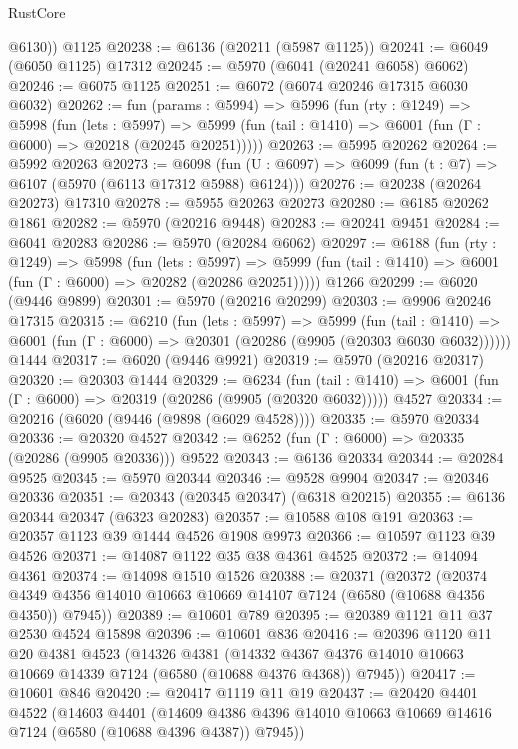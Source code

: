 \begin{lexlean}{RustCore}
\begin{coremodule}
        @6130))
    @1125
@20238 := @6136 (@20211 (@5987 @1125))
@20241 := @6049 (@6050 @1125) @17312
@20245 := @5970 (@6041 (@20241 @6058) @6062)
@20246 := @6075 @1125
@20251 := @6072 (@6074 @20246 @17315 @6030 @6032)
@20262 := fun (params : @5994) =>
  @5996
    (fun (rty : @1249) =>
    @5998
      (fun (lets : @5997) =>
      @5999 (fun (tail : @1410) => @6001 (fun (Γ : @6000) => @20218 (@20245 @20251)))))
@20263 := @5995 @20262
@20264 := @5992 @20263
@20273 := @6098
    (fun (U : @6097) => @6099 (fun (t : @7) => @6107 (@5970 (@6113 @17312 @5988) @6124)))
@20276 := @20238 (@20264 @20273) @17310
@20278 := @5955 @20263 @20273
@20280 := @6185 @20262 @1861
@20282 := @5970 (@20216 @9448)
@20283 := @20241 @9451
@20284 := @6041 @20283
@20286 := @5970 (@20284 @6062)
@20297 := @6188
    (fun (rty : @1249) =>
    @5998
      (fun (lets : @5997) =>
      @5999 (fun (tail : @1410) => @6001 (fun (Γ : @6000) => @20282 (@20286 @20251)))))
    @1266
@20299 := @6020 (@9446 @9899)
@20301 := @5970 (@20216 @20299)
@20303 := @9906 @20246 @17315
@20315 := @6210
    (fun (lets : @5997) =>
    @5999
      (fun (tail : @1410) =>
      @6001 (fun (Γ : @6000) => @20301 (@20286 (@9905 (@20303 @6030 @6032))))))
    @1444
@20317 := @6020 (@9446 @9921)
@20319 := @5970 (@20216 @20317)
@20320 := @20303 @1444
@20329 := @6234
    (fun (tail : @1410) => @6001 (fun (Γ : @6000) => @20319 (@20286 (@9905 (@20320 @6032)))))
    @4527
@20334 := @20216 (@6020 (@9446 (@9898 (@6029 @4528))))
@20335 := @5970 @20334
@20336 := @20320 @4527
@20342 := @6252 (fun (Γ : @6000) => @20335 (@20286 (@9905 @20336))) @9522
@20343 := @6136 @20334
@20344 := @20284 @9525
@20345 := @5970 @20344
@20346 := @9528 @9904
@20347 := @20346 @20336
@20351 := @20343 (@20345 @20347) (@6318 @20215)
@20355 := @6136 @20344 @20347 (@6323 @20283)
@20357 := @10588 @108 @191
@20363 := @20357 @1123 @39 @1444 @4526 @1908 @9973
@20366 := @10597 @1123 @39 @4526
@20371 := @14087 @1122 @35 @38 @4361 @4525
@20372 := @14094 @4361
@20374 := @14098 @1510 @1526
@20388 := @20371
    (@20372
      (@20374 @4349 @4356 @14010 @10663 @10669 @14107 @7124 (@6580 (@10688 @4356 @4350)) @7945))
@20389 := @10601 @789
@20395 := @20389 @1121 @11 @37 @2530 @4524 @15898
@20396 := @10601 @836
@20416 := @20396
    @1120
    @11
    @20
    @4381
    @4523
    (@14326
      @4381
      (@14332 @4367 @4376 @14010 @10663 @10669 @14339 @7124 (@6580 (@10688 @4376 @4368)) @7945))
@20417 := @10601 @846
@20420 := @20417 @1119 @11 @19
@20437 := @20420
    @4401
    @4522
    (@14603
      @4401
      (@14609 @4386 @4396 @14010 @10663 @10669 @14616 @7124 (@6580 (@10688 @4396 @4387)) @7945))

\end{coremodule}
\end{lexlean}

